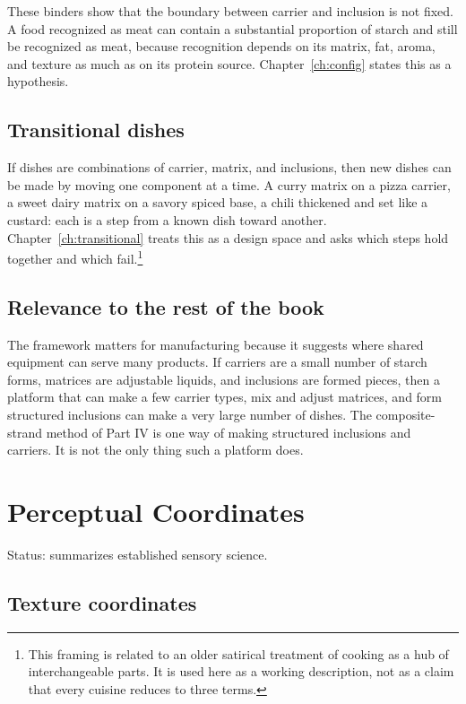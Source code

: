 \documentclass[11pt,openany]{book}
\theoremstyle{definition}
\begin{document}
These binders show that the boundary between carrier and inclusion is not fixed. A food recognized as meat can contain a substantial proportion of starch and still be recognized as meat, because recognition depends on its matrix, fat, aroma, and texture as much as on its protein source. Chapter~\ref{ch:config} states this as a hypothesis.

\section{Transitional dishes}

If dishes are combinations of carrier, matrix, and inclusions, then new dishes can be made by moving one component at a time. A curry matrix on a pizza carrier, a sweet dairy matrix on a savory spiced base, a chili thickened and set like a custard: each is a step from a known dish toward another. Chapter~\ref{ch:transitional} treats this as a design space and asks which steps hold together and which fail.\footnote{This framing is related to an older satirical treatment of cooking as a hub of interchangeable parts. It is used here as a working description, not as a claim that every cuisine reduces to three terms.}

\section{Relevance to the rest of the book}

The framework matters for manufacturing because it suggests where shared equipment can serve many products. If carriers are a small number of starch forms, matrices are adjustable liquids, and inclusions are formed pieces, then a platform that can make a few carrier types, mix and adjust matrices, and form structured inclusions can make a very large number of dishes. The composite-strand method of Part IV is one way of making structured inclusions and carriers. It is not the only thing such a platform does.

\chapter{Perceptual Coordinates}\label{ch:coords}

Status: summarizes established sensory science.

\section{Texture coordinates}
\end{document}
